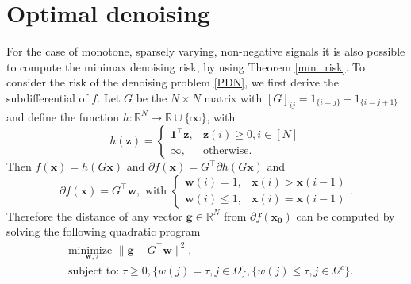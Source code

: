 \documentclass[11pt]{article}
\newcommand{\be}{\begin{equation}}
\newcommand{\ee}{\end{equation}}
\begin{document}
\section{Optimal denoising}
For the case of monotone, sparsely varying, non-negative signals it is also possible to compute the minimax denoising risk, by using Theorem \ref{mm_risk}.
To consider the risk of the denoising problem \eqref{PDN}, we first derive the subdifferential of $f$. Let $G$ be the $N\times N$ matrix with $[G]_{ij} = 1_{\{i=j\}} - 1_{\{i=j+1\}}$ 
and define the function $h:\mathbb{R}^N\mapsto \mathbb{R}\cup\{\infty\}$, with 
\[
	h(\bm{z}) = \left\{ \begin{array}{ll} \bm{1}^{\top}\bm{z}, & \bm{z}(i) \geq 0, i \in [N] \\ \infty, & \text{otherwise.} \end{array} \right.
\]
Then $f(\bm{x}) = h(G\bm{x})$ and $\partial f(\bm{x}) = G^{\top}\partial h(G\bm{x})$ and %
\[
	\partial f(\bm{x}) = G^{\top}\bm{w}, \text{ with } \left\{ \begin{array}{cc} \bm{w}(i) = 1, & \bm{x}(i) > \bm{x}(i-1) \\  \bm{w}(i) \leq 1, & \bm{x}(i) = \bm{x}(i-1) \end{array} \right..
\]
Therefore the distance of any vector $\bm{g}\in\mathbb{R}^N$ from $\partial f(\bm{x_0})$ can be computed by solving the following quadratic program
\be
	\tag{QP}
	\begin{aligned}
		 & \underset{\bm{w},\tau}{\text{minimize }}  \|\bm{g}-G^{\top}\bm{w}\|^2, \\
		& \text{subject to:} \; \tau\geq0, \{w(j)=\tau, j\in \Omega\}, \{w(j) \leq \tau, j\in \Omega^c\}.
	\end{aligned}
	\label{quad}
\ee
\end{document}
